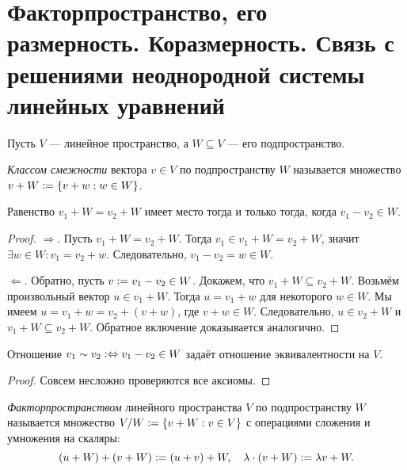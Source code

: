 \section{Факторпространство, его размерность. Коразмерность. Связь с решениями неоднородной системы линейных уравнений}

Пусть $V$ --- линейное пространство, а $W \subseteq V$ --- его подпространство.

\begin{definition}
    \textit{Классом смежности} вектора $v \in V$ по подпространству $W$ называется множество $v + W \vcentcolon = \{v + w : w \in W\}$.
\end{definition}

\begin{lemma}
    Равенство $v_1 + W = v_2 + W$ имеет место тогда и только тогда, когда $v_1 - v_2 \in W$.
\end{lemma}

\begin{proof}
    $\Rightarrow$. Пусть $v_1 + W = v_2 + W$. Тогда $v_1 \in v_1 + W = v_2 + W$, значит $\exists w \in W: v_1 = v_2 + w$. Следовательно, $v_1 - v_2 = w \in W$.

    $\Leftarrow$. Обратно, пусть $v \vcentcolon = v_1 - v_2 \in W$. Докажем, что $v_1 + W \subseteq v_2 + W$. Возьмём произвольный вектор $u \in v_1 + W$. Тогда $u = v_1 + w$ для некоторого $w \in W$. Мы имеем $u = v_1 + w = v_2 + (v + w)$, где $v + w \in W$. Следовательно, $u \in v_2 + W$ и $v_1 + W \subseteq v_2 + W$. Обратное включение доказывается аналогично.
\end{proof}

\begin{proposal}
    Отношение $v_1 \sim v_2 \vcentcolon\Leftrightarrow v_1 - v_2 \in W$ задаёт отношение эквивалентности на $V$.
\end{proposal}

\begin{proof}
    Совсем несложно проверяются все аксиомы.
\end{proof}

\begin{definition}
    \textit{Факторпространством} линейного пространства $V$ по подпространству $W$ называется множество $V / W \vcentcolon = \{v + W : v \in V\}$ с операциями сложения и умножения на скаляры:
    \[
        (u + W) + (v + W) \vcentcolon = (u + v) + W,\quad \lambda \cdot (v + W) \vcentcolon = \lambda v + W.
    \]
\end{definition}

